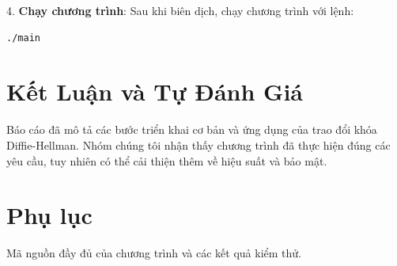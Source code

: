 \documentclass[a4paper,12pt]{article}
\begin{document}
4. \textbf{Chạy chương trình}: Sau khi biên dịch, chạy chương trình với lệnh:
\begin{lstlisting}
./main
\end{lstlisting}



\section{Kết Luận và Tự Đánh Giá}
Báo cáo đã mô tả các bước triển khai cơ bản và ứng dụng của trao đổi khóa Diffie-Hellman. Nhóm chúng tôi nhận thấy chương trình đã thực hiện đúng các yêu cầu, tuy nhiên có thể cải thiện thêm về hiệu suất và bảo mật.

\appendix
\section{Phụ lục}
Mã nguồn đầy đủ của chương trình và các kết quả kiểm thử.
\end{document}
